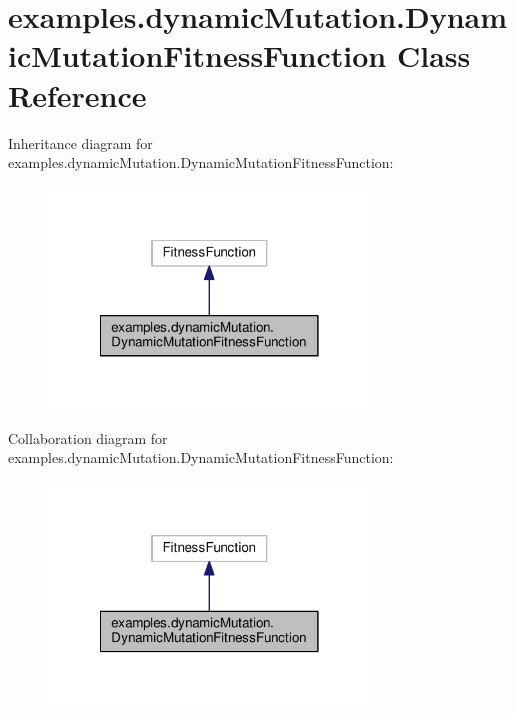 \hypertarget{classexamples_1_1dynamic_mutation_1_1_dynamic_mutation_fitness_function}{\section{examples.\-dynamic\-Mutation.\-Dynamic\-Mutation\-Fitness\-Function Class Reference}
\label{classexamples_1_1dynamic_mutation_1_1_dynamic_mutation_fitness_function}
}


Inheritance diagram for examples.\-dynamic\-Mutation.\-Dynamic\-Mutation\-Fitness\-Function\-:
\nopagebreak
\begin{figure}[H]
\begin{center}
\leavevmode
\includegraphics[width=242pt]{classexamples_1_1dynamic_mutation_1_1_dynamic_mutation_fitness_function__inherit__graph}
\end{center}
\end{figure}


Collaboration diagram for examples.\-dynamic\-Mutation.\-Dynamic\-Mutation\-Fitness\-Function\-:
\nopagebreak
\begin{figure}[H]
\begin{center}
\leavevmode
\includegraphics[width=242pt]{classexamples_1_1dynamic_mutation_1_1_dynamic_mutation_fitness_function__coll__graph}
\end{center}
\end{figure}
